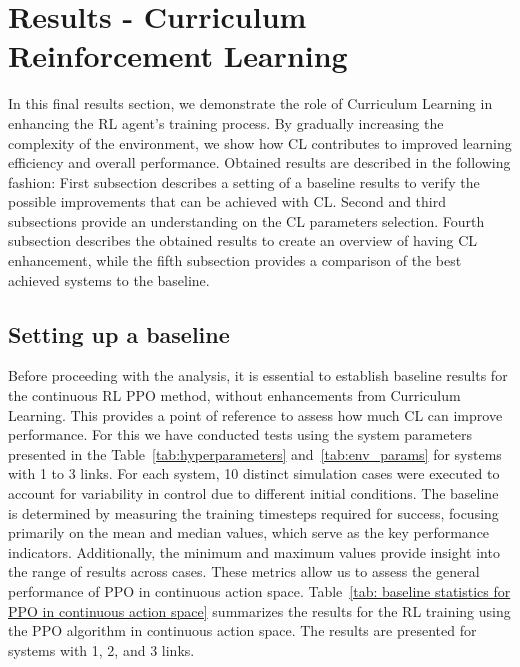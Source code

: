 \section{Results - Curriculum Reinforcement Learning} \label{sec: Results - Curriculum Reinforcement Learning}

In this final results section, we demonstrate the role of Curriculum Learning in enhancing the RL agent’s training process. By gradually increasing the complexity of the environment, we show how CL contributes to improved learning efficiency and overall performance. Obtained results are described in the following fashion:
First subsection describes a setting of a baseline results to verify the possible improvements that can be achieved with CL. Second and third subsections provide an understanding on the CL parameters selection. Fourth subsection describes the obtained results to create an overview of having CL enhancement, while the fifth subsection provides a comparison of the best achieved systems to the baseline. 

\subsection{Setting up a baseline}

Before proceeding with the analysis, it is essential to establish baseline results for the continuous RL PPO method, without enhancements from Curriculum Learning. This provides a point of reference to assess how much CL can improve performance. For this we have conducted tests using the system parameters presented in the Table~\ref{tab:hyperparameters} and~\ref{tab:env_params} for systems with 1 to 3 links. For each system, 10 distinct simulation cases were executed to account for variability in control due to different initial conditions. The baseline is determined by measuring the training timesteps required for success, focusing primarily on the mean and median values, which serve as the key performance indicators. Additionally, the minimum and maximum values provide insight into the range of results across cases. These metrics allow us to assess the general performance of PPO in continuous action space. Table~\ref{tab: baseline statistics for PPO in continuous action space} summarizes the results for the RL training using the PPO algorithm in continuous action space. The results are presented for systems with 1, 2, and 3 links.

